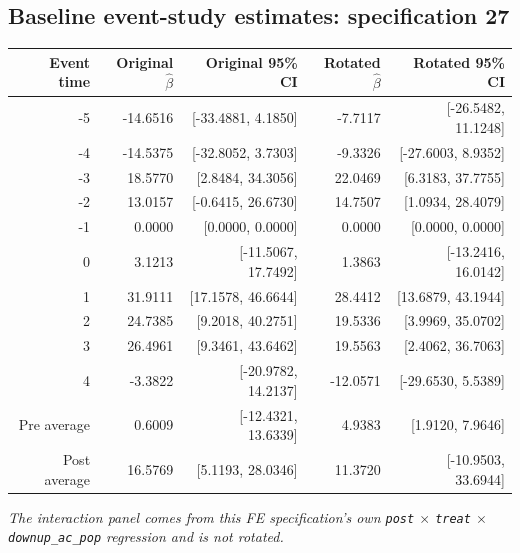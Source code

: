 \documentclass[10pt]{article}
\begin{document}
\subsection*{Baseline event-study estimates: specification 27}
\begin{center}
\scriptsize
\begin{tabular}{r rr rr}
\toprule
Event time & Original $\hat\beta$ & Original 95\% CI & Rotated $\hat\beta$ & Rotated 95\% CI \\
\midrule
-5 & -14.6516 & [-33.4881, 4.1850] & -7.7117 & [-26.5482, 11.1248] \\
-4 & -14.5375 & [-32.8052, 3.7303] & -9.3326 & [-27.6003, 8.9352] \\
-3 & 18.5770 & [2.8484, 34.3056] & 22.0469 & [6.3183, 37.7755] \\
-2 & 13.0157 & [-0.6415, 26.6730] & 14.7507 & [1.0934, 28.4079] \\
-1 & 0.0000 & [0.0000, 0.0000] & 0.0000 & [0.0000, 0.0000] \\
0 & 3.1213 & [-11.5067, 17.7492] & 1.3863 & [-13.2416, 16.0142] \\
1 & 31.9111 & [17.1578, 46.6644] & 28.4412 & [13.6879, 43.1944] \\
2 & 24.7385 & [9.2018, 40.2751] & 19.5336 & [3.9969, 35.0702] \\
3 & 26.4961 & [9.3461, 43.6462] & 19.5563 & [2.4062, 36.7063] \\
4 & -3.3822 & [-20.9782, 14.2137] & -12.0571 & [-29.6530, 5.5389] \\
\midrule
Pre average & 0.6009 & [-12.4321, 13.6339] & 4.9383 & [1.9120, 7.9646] \\
Post average & 16.5769 & [5.1193, 28.0346] & 11.3720 & [-10.9503, 33.6944] \\
\bottomrule
\end{tabular}
\end{center}
\medskip
\textit{The interaction panel comes from this FE specification's own \texttt{post} $\times$ \texttt{treat} $\times$ \texttt{downup\_ac\_pop} regression and is not rotated.}
\clearpage
\end{document}
